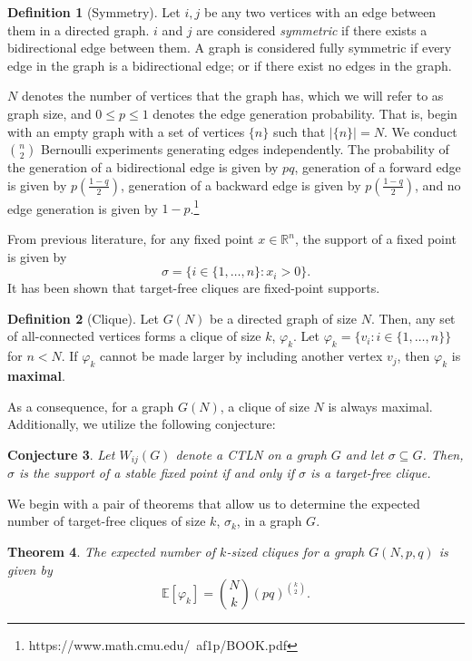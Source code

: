 \documentclass[psamsfonts]{amsart}
\newcommand{\R}{\mathbb{R}}
\newcommand{\E}{\mathbb{E}}
\newtheorem{thm}{Theorem}[section]
\newtheorem{conj}[thm]{Conjecture}
\theoremstyle{definition}
\newtheorem{defn}[thm]{Definition}
\theoremstyle{remark}
\numberwithin{equation}{section}
\begin{document}
\begin{defn}[Symmetry]
  Let $i,j$ be any two vertices with an edge between them in a directed graph. $i$ and $j$ are considered \textit{symmetric} if there exists a bidirectional edge between them. A graph is considered fully symmetric if every edge in the graph is a bidirectional edge; or if there exist no edges in the graph.
\end{defn}
$N$ denotes the number of vertices that the graph has, which we will refer to as graph size, and $0\leq p\leq 1$ denotes the edge generation probability. That is, begin with an empty graph with a set of vertices $\{n\}$ such that $|\{n\}|=N$. We conduct $\binom{n}{2}$ Bernoulli experiments generating edges independently. The probability of the generation of a bidirectional edge is given by $pq$, generation of a forward edge is given by $p\left(\frac{1-q}{2}\right)$, generation of a backward edge is given by $p\left(\frac{1-q}{2} \right)$, and no edge generation is given by $1-p$.\footnote{https://www.math.cmu.edu/~af1p/BOOK.pdf}

From previous literature, for any fixed point $x\in\R^n$, the support of a fixed point is given by 
\[
  \sigma = \{i\in\{1,\ldots,n\} : x_i>0\}
.\] 
It has been shown that target-free cliques are fixed-point supports. 
\begin{defn}[Clique]
  Let $G(N)$ be a directed graph of size $N$. Then, any set of all-connected vertices forms a clique of size $k$, $\varphi_k$. Let $\varphi_k = \{v_i:i\in\{1,\ldots,n\}\}$ for $n < N$. If $\varphi_k$ cannot be made larger by including another vertex $v_j$, then $\varphi_k$ is \textbf{maximal}.
\end{defn}
As a consequence, for a graph $G(N)$, a clique of size $N$ is always maximal.
Additionally, we utilize the following conjecture:
\begin{conj}
  \label{conj:fp_supp}
  Let $W_{ij}(G)$ denote a CTLN on a graph $G$ and let $\sigma\subseteq G$. Then, $\sigma$ is the support of a stable fixed point if and only if $\sigma$ is a target-free clique.
\end{conj}

We begin with a pair of theorems that allow us to determine the expected number of target-free cliques of size $k$, $\sigma_k$, in a graph $G$.
\begin{thm}
  The expected number of $k$-sized cliques for a graph $G(N,p,q)$ is given by
  \begin{equation}
    \label{eq:exp_max_directed}
    \E[\varphi_k] = \binom{N}{k}(pq)^{\binom{k}{2}}
     .
  \end{equation}
\end{thm}
\end{document}

